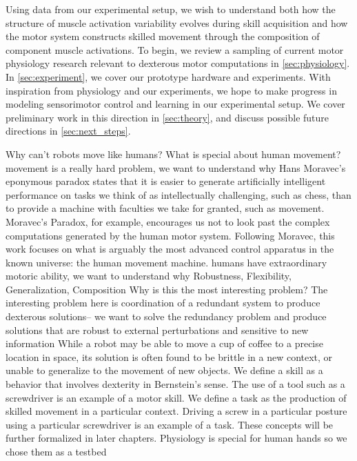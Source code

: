 \documentclass[../main.tex]{subfiles}
\begin{document}
Using data from our experimental setup, we wish to understand both how the structure of muscle activation variability evolves during skill acquisition and how the motor system constructs skilled movement through the composition of component muscle activations. To begin, we review a  sampling of current motor physiology research relevant to dexterous motor computations in \cref{sec:physiology}. In \cref{sec:experiment}, we cover our prototype hardware and experiments. With inspiration from physiology and our experiments, we hope to make progress in modeling sensorimotor control and learning in our experimental setup. We cover preliminary work in this direction in \cref{sec:theory}, and discuss possible future directions in \cref{sec:next_steps}.

Why can't robots move like humans? What is special about human movement?
movement is a really hard problem, we want to understand why
Hans Moravec's eponymous paradox states that it is easier to generate artificially intelligent performance on tasks we think of as intellectually challenging, such as chess, than to provide a machine with faculties we take for granted, such as movement. Moravec's Paradox, for example, encourages us not to look past the complex computations generated by the human motor system. Following Moravec, this work focuses on what is arguably the most advanced control apparatus in the known universe: the human movement machine.
humans have extraordinary motoric ability, we want to understand why
Robustness, Flexibility, Generalization, Composition
Why is this the most interesting problem? 
The interesting problem here is coordination of a redundant system to produce dexterous solutions-- we want to solve the redundancy problem and produce solutions that are robust to external perturbations and sensitive to new information
While a robot may be able to move a cup of coffee to a precise location in space, its solution is often found to be brittle in a new context, or unable to generalize to the movement of new objects. We define a skill as a behavior that involves dexterity in Bernstein's sense. The use of a tool such as a screwdriver is an example of a motor skill. We define a task as the production of skilled movement in a particular context. Driving a screw in a particular posture using a particular screwdriver is an example of a task. These concepts will be further formalized in later chapters. 
Physiology is special for human hands so we chose them as a testbed
\end{document}
